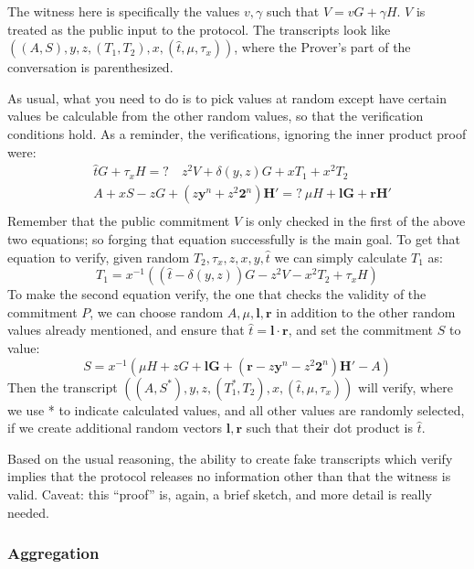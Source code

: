 \documentclass[10pt,a4paper]{article}
\begin{document}
The witness here is specifically the values $v, \gamma$ such that $V = vG + \gamma H$. $V$ is treated as
the public input to the protocol. The transcripts look like $((A, S), y, z, (T_1, T_2), x, (\hat{t}, \mu, \tau_x))$, where the
Prover's part of the conversation is parenthesized.

As usual, what you need to do is to pick values at random except have
certain values be calculable from the other random values, so that the
verification conditions hold. As a reminder, the verifications, ignoring
the inner product proof were:
\begin{align*}
& \hat{t}G + \tau_x H =? \quad z^2V + \delta(y, z) G + xT_1 + x^2T_2 \\
&  A + xS -zG + \left(z\textbf{y}^n + z^2\textbf{2}^n\right)\textbf{H}' =? \ \mu H + \textbf{lG} + \textbf{rH}' \\
\end{align*}
Remember that the public commitment $V$ is only checked in the first of the
above two equations; so forging that equation successfully is the main
goal. To get that equation to verify, given random $T_2, \tau_x, z, x, y, \hat{t}$ we can simply
calculate $T_1$ as:
\[T_1 = x^{-1}\left((\hat{t}-\delta(y,z))G -z^2 V - x^2T_2 + \tau_x H\right)\]
To make the second equation verify, the one that checks the validity of
the commitment $P$, we can choose random $A, \mu, \textbf{l}, \textbf{r}$ in addition to the other random
values already mentioned, and ensure that $\hat{t} = \textbf{l}\cdot \textbf{r}$, and set the commitment $S$ to
value:
\[S = x^{-1}\left(\mu H + zG + \textbf{lG} + (\textbf{r} -z\textbf{y}^n -z^2\textbf{2}^n)\textbf{H}' -A\right)\]
Then the transcript $((A, S^*), y, z, (T_1^*, T_2), x, (\hat{t}, \mu, \tau_x))$ will verify, where we use * to indicate calculated
values, and all other values are randomly selected, if we create
additional random vectors $\mathbf{l}, \mathbf{r}$ such that their dot product is $\hat{t}$.

Based on the usual reasoning, the ability to create fake transcripts
which verify implies that the protocol releases no information other
than that the witness is valid. Caveat: this ``proof'' is, again, a
brief sketch, and more detail is really needed.

\hypertarget{aggregation}{%
\subsubsection[Aggregation]{\texorpdfstring{\protect\hypertarget{anchor-66}{}{}Aggregation}{Aggregation}}\label{aggregation}}
\end{document}
